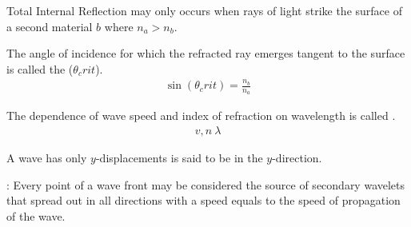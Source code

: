  \par Total Internal Reflection may only occurs when rays of light strike
    the surface of a second material $b$ where $n_a > n_b$.
  \par The angle of incidence for which the refracted ray emerges tangent to
    the surface is called the  ($\theta_crit$).
    \begin{align*}
      \sin(\theta_crit) = \frac{n_b}{n_a}
    \end{align*}


  \par The dependence of wave speed and index of refraction on wavelength
    is called .
    \begin{align*}
      v, n ~ \lambda
    \end{align*}


    \par A wave has only $y$-displacements is said to be 
      in the $y$-direction.


    \par {}: Every point of a wave front may be considered the source
      of secondary wavelets that spread out in all directions with a speed equals to the speed of
      propagation of the wave.

